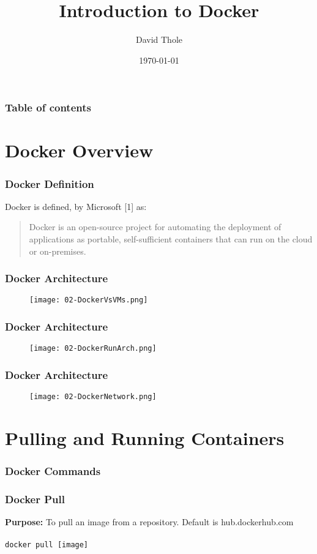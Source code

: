 \documentclass{beamer}
\begin{document}
\title{Introduction to Docker}
\author{David Thole}
\date{\today} 
\begin{frame}
\titlepage
\end{frame}

\begin{frame}\frametitle{Table of contents}\tableofcontents
\end{frame} 


\section{Docker Overview}
\begin{frame}\frametitle{Docker Definition}
  Docker is defined, by Microsoft \small{[1]} as:
  \begin{quote}
    Docker is an open-source project for automating the deployment of applications as portable, self-sufficient containers that can run on the cloud or on-premises.
  \end{quote}
\end{frame}
\begin{frame}\frametitle{Docker Architecture}
  \begin{figure}
    \texttt{[image: 02-DockerVsVMs.png]}
  \end{figure}
\end{frame}
\begin{frame}\frametitle{Docker Architecture}
  \begin{figure}
    \texttt{[image: 02-DockerRunArch.png]}
  \end{figure}
\end{frame}
\begin{frame}\frametitle{Docker Architecture}
  \begin{figure}
    \texttt{[image: 02-DockerNetwork.png]}
  \end{figure}
\end{frame}

\section{Pulling and Running Containers}
\begin{frame}\frametitle{Docker Commands}

\end{frame}

\begin{frame}\frametitle{Docker Pull}
  \textbf{Purpose:} To pull an image from a repository.  Default is hub.dockerhub.com
  \\ \\
  \texttt{docker pull [image]}
\end{frame}
\end{document}

